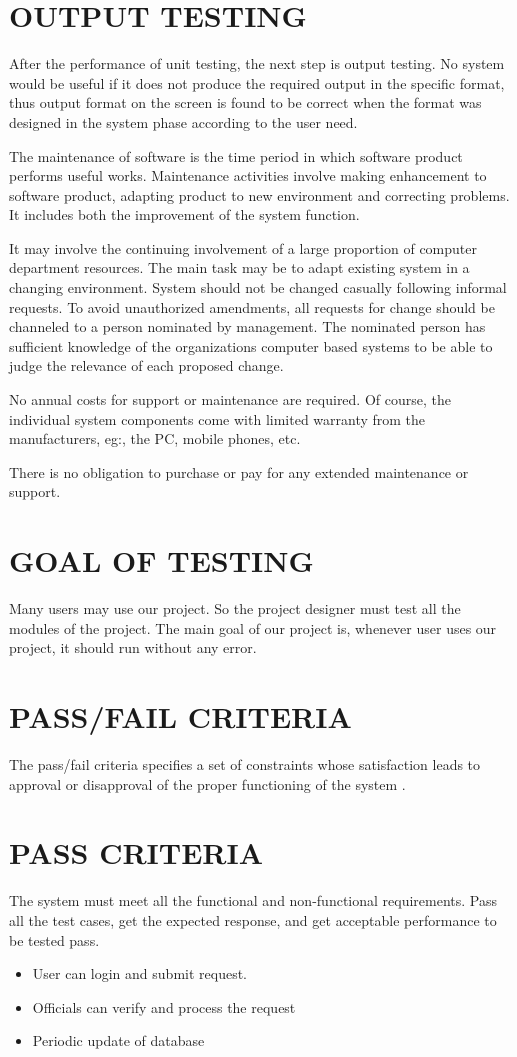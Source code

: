 \documentclass[12pt,a4paper,oneside]{report}
\begin{document}
{\section{OUTPUT TESTING}
\par After the performance of unit testing, the next step is output testing. No system would be useful if it does not produce the required output in the specific format, thus output format on the screen is found to be correct when the format was designed in the system phase according to the user need.\\
\par The maintenance of software is the time period in which software product performs useful works. Maintenance activities involve making enhancement to software product, adapting product to new environment and correcting problems. It includes both the improvement of the system function.
\par It may involve the continuing involvement of a large proportion of computer department resources. The main task may be to adapt existing system in a changing environment. System should not be changed casually following informal requests. To avoid unauthorized amendments, all requests for change should be channeled to a person nominated by management. The nominated person has sufficient knowledge of the organizations computer based systems to be able to judge the relevance of each proposed change.
\par No annual costs for support or maintenance are required. Of course, the individual system components come with limited warranty from the manufacturers, eg:, the PC, mobile phones, etc.
\par There is no obligation to purchase or pay for any extended maintenance or support.
\section{GOAL OF TESTING}
\par Many users may use our project. So the project designer must test all the modules of the project. The main goal of our project is, whenever user uses our project, it should run without any error.
\section{PASS/FAIL CRITERIA}
The pass/fail criteria specifies a set of constraints whose satisfaction leads to approval or disapproval of the proper functioning of the system .
\section{PASS CRITERIA}
\par The system must meet all the functional and non-functional requirements. Pass all the test cases, get the expected response, and get acceptable performance to be tested pass.
\begin{itemize}
\item	User can login and submit request.
\item	Officials can verify and process the request
\item	Periodic update of database
\end{itemize}
}
\end{document}
